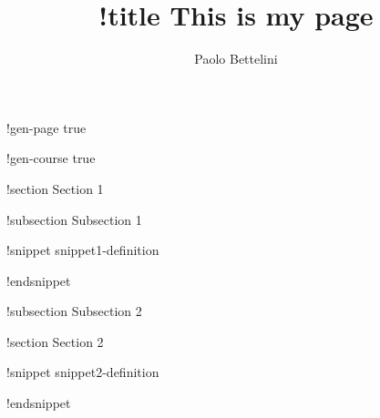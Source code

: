 \documentclass[preview]{standalone}
\title{!title This is my page}
\author{Paolo Bettelini}
\date{}
\begin{document}
\maketitle
\tableofcontents
\pagebreak

!gen-page true

!gen-course true

!section Section 1

!subsection Subsection 1

!snippet snippet1-definition


!endsnippet

!subsection Subsection 2

!section Section 2

!snippet snippet2-definition


!endsnippet

\pagebreak
\end{document}
